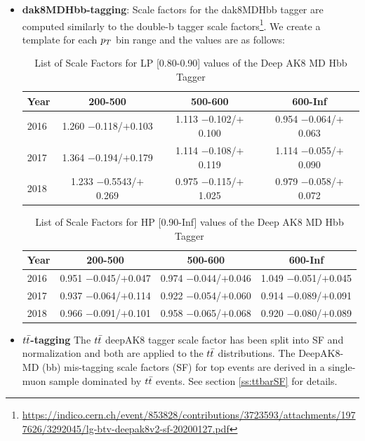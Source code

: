 \begin{itemize}
\item \textbf{dak8MDHbb-tagging}: Scale factors for the dak8MDHbb tagger are computed similarly to the double-b tagger scale factors\footnote{ \url{https://indico.cern.ch/event/853828/contributions/3723593/attachments/1977626/3292045/lg-btv-deepak8v2-sf-20200127.pdf}}. We create a template for each $p_{T}$ bin range and the values are as follows:
\begin{table}[htb]\footnotesize
  \begin{center}
    \caption{List of Scale Factors for LP [0.80-0.90] values of the Deep AK8 MD Hbb Tagger}
    \begin{tabular}{l|c|c|c}
      \hline
      \hline
      Year & 200-500 & 500-600	& 600-Inf \\
      \hline
      2016 &	1.260 $-$0.118/$+$0.103	 & 1.113 $-$0.102/$+$0.100	& 0.954 $-$0.064/$+$0.063\\
      2017 &	1.364 $-$0.194/$+$0.179	 & 1.114 $-$0.108/$+$0.119	& 1.114 $-$0.055/$+$0.090\\
      2018 &	1.233 $-$0.5543/$+$0.269 &	0.975 $-$0.115/$+$1.025 &	0.979 $-$0.058/$+$0.072\\
      \hline
      \hline  
    \end{tabular}  
    \label{tab:dak8HbbSFsLP}
  \end{center}
\end{table}
\begin{table}[htb]\footnotesize
  \begin{center}
    \caption{List of Scale Factors for HP [0.90-Inf] values of the Deep AK8 MD Hbb Tagger}
    \begin{tabular}{l|c|c|c}
      \hline
      \hline
      Year & 200-500 & 500-600	& 600-Inf \\
      \hline
      2016 &	0.951 $-$0.045/$+$0.047 &	0.974 $-$0.044/$+$0.046 &	1.049 $-$0.051/$+$0.045\\
      2017 &	0.937 $-$0.064/$+$0.114 &	0.922 $-$0.054/$+$0.060 &	0.914 $-$0.089/$+$0.091\\
      2018 &	0.966 $-$0.091/$+$0.101 &	0.958 $-$0.065/$+$0.068 &	0.920 $-$0.080/$+0$.089\\
      \hline
      \hline  
    \end{tabular}  
    \label{tab:dak8HbbSFsHP}
  \end{center}
\end{table}
\item \textbf{$t\bar{t} $-tagging}
The $t\bar{t} $ deepAK8 tagger scale factor has been split into SF and normalization and both are applied to the $t\bar{t} $ distributions. The DeepAK8-MD (bb) mis-tagging scale factors (SF) for top events are derived in a single-muon sample dominated by $t\bar{t} $ events. See section \ref{ss:ttbarSF} for details. 


\end{itemize}
